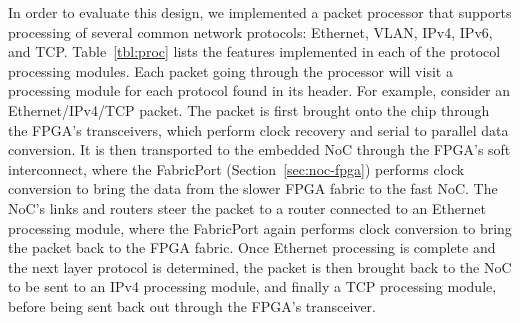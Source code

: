 %
%

In order to evaluate this design, we implemented a packet processor that supports processing of several common network protocols: Ethernet, VLAN, IPv4, IPv6, and TCP.
Table~\ref{tbl:proc} lists the features implemented in each of the protocol processing modules.
Each packet going through the processor will visit a processing module for each protocol found in its header.
For example, consider an Ethernet/IPv4/TCP packet.
The packet is first brought onto the chip through the FPGA's transceivers, which perform clock recovery and serial to parallel data conversion.
It is then transported to the embedded NoC through the FPGA's soft interconnect, where the FabricPort (Section~\ref{sec:noc-fpga}) performs clock conversion to bring the data from the slower FPGA fabric to the fast NoC.
The NoC's links and routers steer the packet to a router connected to an Ethernet processing module, where the FabricPort again performs clock conversion to bring the packet back to the FPGA fabric.
Once Ethernet processing is complete and the next layer protocol is determined, the packet is then brought back to the NoC to be sent to an IPv4 processing module, and finally a TCP processing module, before being sent back out through the FPGA's transceiver.


